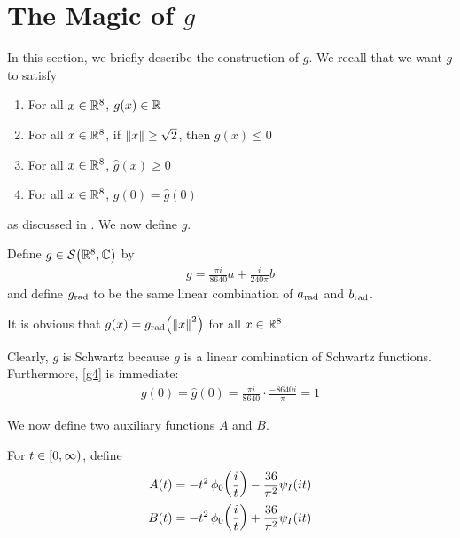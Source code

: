 \section{The Magic of $g$}
\label{Ch4:Sec:g_Properties}

In this section, we briefly describe the construction of $g$. We recall that we want $g$ to satisfy
\begin{enumerate}[label=(Property \arabic*), leftmargin=0.8in]
    \item\label{g1} For all $x \in \mathbb{R}^8$, $g(x) \in \mathbb{R}$
    \item\label{g2} For all $x \in \mathbb{R}^8$, if $\left\lVert x \right\rVert \geq \sqrt{2}$, then $g(x) \leq 0$
    \item\label{g3} For all $x \in \mathbb{R}^8$, $\hat{g}(x) \geq 0$
    \item\label{g4} For all $x \in \mathbb{R}^8$, $g(0) = \hat{g}(0)$
\end{enumerate}
as discussed in . We now define $g$.

\begin{boxdefinition}
    Define $g \in \mathcal{S}\!\left( \mathbb{R}^8, \mathbb{C} \right)$ by
    \begin{align*}
        g = \frac{\pi i}{8640} a + \frac{i}{240\pi} b
    \end{align*}
    and define $g_{\operatorname{rad}}$ to be the same linear combination of $a_{\operatorname{rad}}$ and $b_{\operatorname{rad}}$.
\end{boxdefinition}
It is obvious that $g(x) = g_{\operatorname{rad}}\!\left( \left\lVert x \right\rVert^2 \right)$ for all $x \in \mathbb{R}^8$.

Clearly, $g$ is Schwartz because $g$ is a linear combination of Schwartz functions. Furthermore, \ref{g4} is immediate:
\begin{align*}
    g(0) = \hat{g}(0) = \frac{\pi i}{8640} \cdot \frac{-8640 i}{\pi} = 1
\end{align*}

We now define two auxiliary functions $A$ and $B$.

\begin{boxdefinition}
    For $t \in \left[0, \infty\right)$, define
    \begin{align*}
        A(t) &= -t^2 \, \phi_0\!\left( \frac{i}{t} \right) - \frac{36}{\pi^2} \psi_I\!\left( it \right) \\
        B(t) &= -t^2 \, \phi_0\!\left( \frac{i}{t} \right) + \frac{36}{\pi^2} \psi_I\!\left( it \right)
    \end{align*}
\end{boxdefinition}

